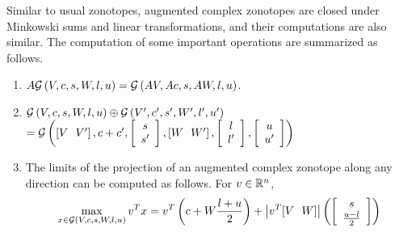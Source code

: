 Similar to usual zonotopes, augmented
complex zonotopes are closed under Minkowski sums and linear
transformations, and their computations are also similar. The computation of some important operations are summarized as follows.

\begin{enumerate}
\item $A\mathcal{G}\left(V,c,s,W,l,u\right) = \mathcal{G}\left(AV,Ac,s,AW,l,u\right)$.
\item $\mathcal{G}\left(V,c,s,W,l,u\right)\oplus
  \mathcal{G}\left(V^\prime,c^\prime,s^\prime,W^\prime,l^\prime,u^\prime\right)$\\
$= \mathcal{G}\left(\left[V~~V^\prime\right],c+c^\prime,\left[\begin{array}{c}{s}\\{s^\prime} \end{array}\right],\left[W~~W^\prime\right],\left[\begin{array}{c}{l}\\{l^\prime} \end{array}\right],\left[\begin{array}{c}{u}\\{u^\prime} \end{array}\right]\right)$

%
\item The limits of the projection of an augmented complex zonotope along
any direction can be computed as follows. For $v\in\mathbb{R}^n$,
\begin{equation}\label{lem:polylimits-acz}
\max_{x\in\mathcal{G}\left(V,c,s,W,l,u\right)}v^Tx = v^T\left(c+W\frac{l+u}{2}\right)+\left|v^T[V~~W]\right|\left(\left[\begin{array}{c}{s}\\{\frac{u-l}{2}} \end{array}\right]\right)
\end{equation}
\end{enumerate}
%


